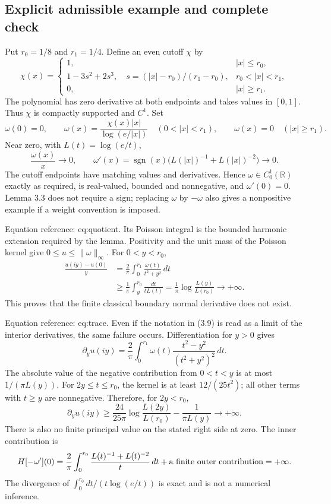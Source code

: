 \documentclass[10pt]{article}
\begin{document}
\subsection*{Explicit admissible example and complete check}
Put \(r_0=1/8\) and \(r_1=1/4\). Define an even cutoff \(\chi\) by \[\chi(x)=
 \begin{cases}
 1,& |x|\leq r_0,\\
 1-3s^2+2s^3,\quad s=(|x|-r_0)/(r_1-r_0),
       &r_0<|x|<r_1,\\
 0,&|x|\geq r_1.
 \end{cases}\] The polynomial has zero derivative at both endpoints and takes values in \([0,1]\). Thus \(\chi\) is compactly supported and \(C^1\). Set \[\omega(0)=0,\qquad
 \omega(x)=\frac{\chi(x)|x|}{\log(e/|x|)}
   \quad(0<|x|<r_1),\qquad
 \omega(x)=0\quad(|x|\geq r_1).\] Near zero, with \(L(t)=\log(e/t)\), \[\frac{\omega(x)}x\longrightarrow0,\qquad
 \omega'(x)=\operatorname{sgn}(x)
       \bigl(L(|x|)^{-1}+L(|x|)^{-2}\bigr)\longrightarrow0.\] The cutoff endpoints have matching values and derivatives. Hence \(\omega\in C^1_0(\mathbb R)\) exactly as required, is real-valued, bounded and nonnegative, and \(\omega'(0)=0\). Lemma 3.3 does not require a sign; replacing \(\omega\) by \(-\omega\) also gives a nonpositive example if a weight convention is imposed.\par
Equation reference: eq:quotient. Its Poisson integral is the bounded harmonic extension required by the lemma. Positivity and the unit mass of the Poisson kernel give \(0\leq u\leq\|\omega\|_\infty\). For \(0<y<r_0\), \[\begin{aligned}
 \frac{u(iy)-u(0)}{y}
 &=\frac2\pi\int_0^{r_1}
          \frac{\omega(t)}{t^2+y^2}\,dt\\
 &\geq\frac1\pi\int_y^{r_0}\frac{dt}{tL(t)}
 =\frac1\pi\log\frac{L(y)}{L(r_0)}
 \longrightarrow+\infty. \end{aligned}\] This proves that the finite classical boundary normal derivative does not exist.\par
Equation reference: eq:trace. Even if the notation in (3.9) is read as a limit of the interior derivatives, the same failure occurs. Differentiation for \(y>0\) gives \[\partial_yu(iy)=\frac2\pi\int_0^{r_1}
       \omega(t)\frac{t^2-y^2}{(t^2+y^2)^2}\,dt.\] The absolute value of the negative contribution from \(0<t<y\) is at most \(1/(\pi L(y))\). For \(2y\leq t\leq r_0\), the kernel is at least \(12/(25t^2)\); all other terms with \(t\geq y\) are nonnegative. Therefore, for \(2y<r_0\), \[\partial_yu(iy)\geq
 \frac{24}{25\pi}\log\frac{L(2y)}{L(r_0)}
       -\frac1{\pi L(y)}
 \longrightarrow+\infty. \] There is also no finite principal value on the stated right side at zero. The inner contribution is \[H[-\omega'](0)
 =\frac2\pi\int_0^{r_0}
    \frac{L(t)^{-1}+L(t)^{-2}}{t}\,dt
       +\hbox{a finite outer contribution}
 =+\infty.\] The divergence of \(\int_0^{r_0}dt/(t\log(e/t))\) is exact and is not a numerical inference.\par
\end{document}

